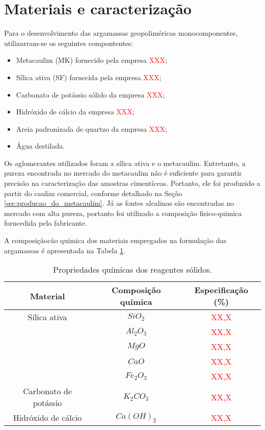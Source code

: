 \section{Materiais e caracterização}
\label{sec:materiais_e_caracterizacao}

Para o desenvolvimento das argamassas geopoliméricas monocomponentes, utilizarram-se os seguintes compontentes:

\begin{itemize}
    \item Metacaulim (MK) fornecido pela empresa \textcolor{red}{XXX};
    \item Sílica ativa (SF) fornecida pela empresa \textcolor{red}{XXX};
    \item Carbonato de potássio sólido da empresa \textcolor{red}{XXX};
    \item Hidróxido de cálcio da empresa \textcolor{red}{XXX};
    \item Areia padronizada de quartzo da empresa \textcolor{red}{XXX};
    \item Água destilada.
\end{itemize}

Os aglomerantes utilizados foram a sílica ativa e o metacaulim. Entretanto, a pureza encontrada no mercado do metacaulim não é suficiente para garantir precisão na caracterização das amostras cimentíceas.
Portanto, ele foi produzido a partir do caulim comercial, conforme detalhado na Seção \ref{sec:producao_do_metacaulim}.
Já as fontes alcalinas são encontradas no mercado com alta pureza, portanto foi utilizado a composição fisico-quimica forncedida pelo fabricante.

A composiçãocão química dos materiais empregados na formulação das argamassas é apresentada na Tabela \ref{tab:composicao_quimica_reagentes}.

\begin{table}[H]
    \caption{Propriedades químicas dos reagentes sólidos.}
    \label{tab:composicao_quimica_reagentes}
    \center
    \begin{tabular}{ccc}
        \hline
        Material & Composição química & Especificação (\%)\\
        \hline
        Sílica ativa & $SiO_2$ &  \textcolor{red}{XX,X} \\
            & $ Al_2O_3$ & \textcolor{red}{XX,X} \\
            & $MgO$ & \textcolor{red}{XX,X} \\
            & $CaO$ & \textcolor{red}{XX,X} \\
            & $Fe_2O_3$ & \textcolor{red}{XX,X} \\
        Carbonato de potássio & $K_2CO_3$ & \textcolor{red}{XX,X} \\
        Hidróxido de cálcio & $Ca(OH)_2$ & \textcolor{red}{XX,X} \\
        \hline
    \end{tabular}
\end{table}

